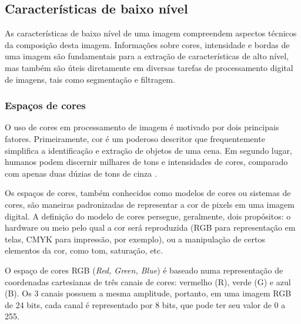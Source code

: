 \subsection{Características de baixo nível}

As características de baixo nível de uma imagem compreendem aspectos técnicos da composição desta imagem. Informações sobre cores, intensidade e bordas de uma imagem são fundamentais para a extração de características de alto nível, mas também são úteis diretamente em diversas tarefas de processamento digital de imagens, tais como segmentação e filtragem.

\subsubsection*{Espaços de cores}

O uso de cores em processamento de imagem é motivado por dois principais fatores. Primeiramente, cor é um poderoso descritor que frequentemente simplifica a identificação e extração de objetos de uma cena. Em segundo lugar, humanos podem discernir milhares de tons e intensidades de cores, comparado com apenas duas dúzias de tons de cinza \cite{gonzalez:2002}.

Os espaços de cores, também conhecidos como modelos de cores ou sistemas de cores, são maneiras padronizadas de representar a cor de pixels em uma imagem digital. A definição do modelo de cores persegue, geralmente, dois propósitos: o hardware ou meio pelo qual a cor será reproduzida (RGB para representação em telas, CMYK para impressão, por exemplo), ou a manipulação de certos elementos da cor, como tom, saturação, etc.

O espaço de cores RGB (\textit{Red, Green, Blue}) é baseado numa representação de coordenadas cartesianas de três canais de cores: vermelho (R), verde (G) e azul (B). Os 3 canais possuem a mesma amplitude, portanto, em uma imagem RGB de 24 bits, cada canal é representado por 8 bits, que pode ter seu valor de 0 a 255.

%

